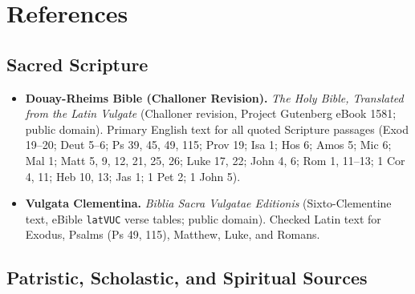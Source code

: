 \section{References}

\subsection*{Sacred Scripture}

\begin{itemize}
\item \textbf{Douay-Rheims Bible (Challoner Revision).} \emph{The Holy Bible, Translated from the Latin Vulgate} (Challoner revision, Project Gutenberg eBook 1581; public domain). Primary English text for all quoted Scripture passages (Exod 19--20; Deut 5--6; Ps 39, 45, 49, 115; Prov 19; Isa 1; Hos 6; Amos 5; Mic 6; Mal 1; Matt 5, 9, 12, 21, 25, 26; Luke 17, 22; John 4, 6; Rom 1, 11--13; 1 Cor 4, 11; Heb 10, 13; Jas 1; 1 Pet 2; 1 John 5).
\item \textbf{Vulgata Clementina.} \emph{Biblia Sacra Vulgatae Editionis} (Sixto-Clementine text, eBible \texttt{latVUC} verse tables; public domain). Checked Latin text for Exodus, Psalms (Ps 49, 115), Matthew, Luke, and Romans.
\end{itemize}

\subsection*{Patristic, Scholastic, and Spiritual Sources}

